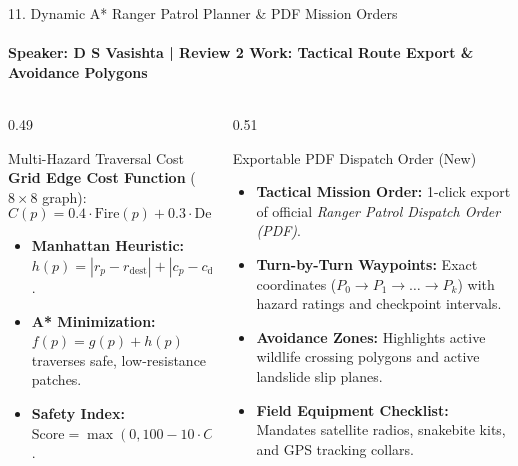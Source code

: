 \documentclass[aspectratio=169, 11pt]{beamer}
\begin{document}
\begin{frame}{11. Dynamic A* Ranger Patrol Planner \& PDF Mission Orders}
    \framesubtitle{\textbf{\textcolor{amritaGold}{Speaker: D S Vasishta}} \quad | \quad Review 2 Work: Tactical Route Export \& Avoidance Polygons}
    \begin{columns}[t]
        \begin{column}{0.49\textwidth}
            \begin{block}{Multi-Hazard Traversal Cost}
                \footnotesize
                \textbf{Grid Edge Cost Function} ($8 \times 8$ graph):
                \vspace{-2pt}
                $$C(p) = 0.4 \cdot \text{Fire}(p) + 0.3 \cdot \text{Deg}(p) + 0.3 \cdot \text{Wildlife}(p)$$
                \vspace{-4pt}
                \begin{itemize}
                    \setlength{\itemsep}{2pt}
                    \item \textbf{Manhattan Heuristic:} $h(p) = |r_p - r_{\text{dest}}| + |c_p - c_{\text{dest}}|$.
                    \item \textbf{A* Minimization:} $f(p) = g(p) + h(p)$ traverses safe, low-resistance patches.
                    \item \textbf{Safety Index:} $\text{Score} = \max(0, 100 - 10 \cdot C_{\text{total}})$.
                \end{itemize}
            \end{block}
        \end{column}
        \begin{column}{0.51\textwidth}
            \begin{exampleblock}{Exportable PDF Dispatch Order (New)}
                \footnotesize
                \begin{itemize}
                    \setlength{\itemsep}{2pt}
                    \item \textbf{Tactical Mission Order:} 1-click export of official \textit{Ranger Patrol Dispatch Order (PDF)}.
                    \item \textbf{Turn-by-Turn Waypoints:} Exact coordinates ($P_0 \to P_1 \to \dots \to P_k$) with hazard ratings and checkpoint intervals.
                    \item \textbf{Avoidance Zones:} Highlights active wildlife crossing polygons and active landslide slip planes.
                    \item \textbf{Field Equipment Checklist:} Mandates satellite radios, snakebite kits, and GPS tracking collars.
                \end{itemize}
            \end{exampleblock}
        \end{column}
    \end{columns}
\end{frame}
\end{document}
